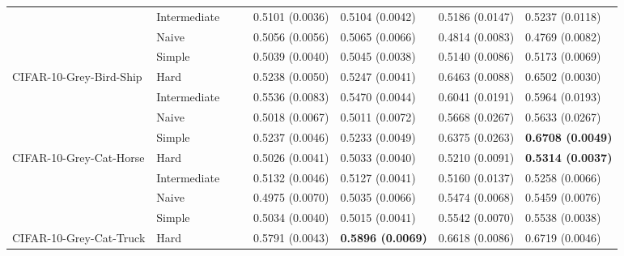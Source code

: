 \begin{tabular}{llllllll}
                 & Intermediate &                  &                           &           0.5101 (0.0036) &           0.5104 (0.0042) &           0.5186 (0.0147) &           0.5237 (0.0118) \\
                 & Naive &                  &                           &           0.5056 (0.0056) &           0.5065 (0.0066) &           0.4814 (0.0083) &           0.4769 (0.0082) \\
                 & Simple &                  &                           &           0.5039 (0.0040) &           0.5045 (0.0038) &           0.5140 (0.0086) &           0.5173 (0.0069) \\
CIFAR-10-Grey-Bird-Ship & Hard &                  &                           &           0.5238 (0.0050) &           0.5247 (0.0041) &           0.6463 (0.0088) &           0.6502 (0.0030) \\
                 & Intermediate &                  &                           &           0.5536 (0.0083) &           0.5470 (0.0044) &           0.6041 (0.0191) &           0.5964 (0.0193) \\
                 & Naive &                  &                           &           0.5018 (0.0067) &           0.5011 (0.0072) &           0.5668 (0.0267) &           0.5633 (0.0267) \\
                 & Simple &                  &                           &           0.5237 (0.0046) &           0.5233 (0.0049) &           0.6375 (0.0263) &  \textbf{0.6708 (0.0049)} \\
CIFAR-10-Grey-Cat-Horse & Hard &                  &                           &           0.5026 (0.0041) &           0.5033 (0.0040) &           0.5210 (0.0091) &  \textbf{0.5314 (0.0037)} \\
                 & Intermediate &                  &                           &           0.5132 (0.0046) &           0.5127 (0.0041) &           0.5160 (0.0137) &           0.5258 (0.0066) \\
                 & Naive &                  &                           &           0.4975 (0.0070) &           0.5035 (0.0066) &           0.5474 (0.0068) &           0.5459 (0.0076) \\
                 & Simple &                  &                           &           0.5034 (0.0040) &           0.5015 (0.0041) &           0.5542 (0.0070) &           0.5538 (0.0038) \\
CIFAR-10-Grey-Cat-Truck & Hard &                  &                           &           0.5791 (0.0043) &  \textbf{0.5896 (0.0069)} &           0.6618 (0.0086) &           0.6719 (0.0046) \\

\end{tabular}
